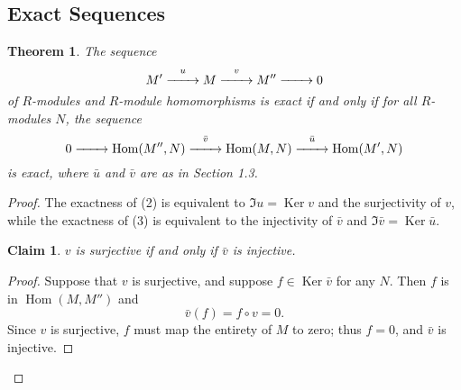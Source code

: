 \documentclass[11pt]{article}
\newtheorem{theorem}{Theorem}
\newtheorem{claim}{Claim}
\newcommand{\Hom}{\operatorname{Hom}}
\newcommand{\Ker}{\operatorname{Ker}}
\renewcommand{\longrightarrow}{\xrightarrow{\hspace*{0.7cm}}}
\begin{document}
\subsection{Exact Sequences}

\begin{adjustwidth}{0.5cm}{}
	\begin{theorem}
		The sequence
		\begin{equation}
			M' \stackrel{u}{\longrightarrow} M \stackrel{v}{\longrightarrow} M'' \longrightarrow 0
		\end{equation}
		of $R$-modules and $R$-module homomorphisms is exact if and only if for all $R$-modules $N$, the sequence
		\begin{equation}
			0 \longrightarrow \Hom(M'', N) \stackrel{\bar{v}}{\longrightarrow} \Hom(M, N) \stackrel{\bar{u}}{\longrightarrow} \Hom(M', N)
		\end{equation}
		is exact, where $\bar{u}$ and $\bar{v}$ are as in Section 1.3.
	\end{theorem}
	\newpage
	\begin{proof}
		The exactness of (2) is equivalent to $\Im u = \Ker v$ and the surjectivity of $v$, while the exactness of (3) is equivalent to the injectivity of $\bar{v}$ and $\Im \bar{v} = \Ker \bar{u}$.
		\begin{adjustwidth}{0.5cm}{}
			\begin{claim}
				$v$ is surjective if and only if $\bar{v}$ is injective.
			\end{claim}
			\begin{proof}\renewcommand{\qedsymbol}{}
				Suppose that $v$ is surjective, and suppose $f \in \Ker \bar{v}$ for any $N$. Then $f$ is in $\Hom(M, M'')$ and
				\[
					\bar{v}(f) = f \circ v = 0.
				\]
				Since $v$ is surjective, $f$ must map the entirety of $M$ to zero; thus $f = 0$, and $\bar{v}$ is injective.


\end{proof}
\end{adjustwidth}
\end{proof}
\end{adjustwidth}
\end{document}
